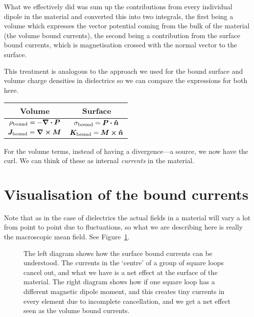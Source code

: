 \documentclass[12pt,chapterprefix=false,dvipsnames]{scrbook}
\theoremstyle{dotless}
\theoremstyle{definition}
\begin{document}
What we effectively did was sum up the contributions from every
individual dipole in the material and converted this into two
integrals, the first being a volume which expresses the vector
potential coming from the bulk of the material (the volume bound
currents), the second being a contribution from the surface
bound currents, which is magnetisation crossed with the normal
vector to the surface.

This treatment is analogous to the approach we used for the
bound surface and volume charge densities in dielectrics so we
can compare the expressions for both here.

\begin{center}
	\begin{tabular}{c  c}
		\textbf{Volume}                              & \textbf{Surface}         \\
		\toprule
		$\rho_\textrm{bound} = -\divergence{\bm{P}}$ & $\sigma_\textrm{bound} =
		\bm{P}\vdot\bm{\hat{n}}$                                                \\
		$\bm{J}_\textrm{bound} =
		\curl{\bm{M}}$                               & $\bm{K}_\textrm{bound} =
		\bm{M}\cross\bm{\hat{n}}$                                               \\
	\end{tabular}
\end{center}

For the volume terms, instead of having a divergence---a source,
we now have the curl. We can think of these as internal
\textit{currents} in the material.

\section{Visualisation of the bound currents}%
\label{sec:visualisation_of_the_bound_currents}

Note that as in the case of dielectrics the actual fields in a
material will vary a lot from point to point due to
fluctuations, so what we are describing here is really the
macroscopic mean field. See Figure~\ref{fig:visualising_magnetic_surface_volume_bound_currents}.

\begin{figure}[htpb]
	\centering
	
	\caption{The left diagram shows how the surface bound currents can be
		understood. The currents in the `centre' of a group of square
		loops cancel out, and what we have is a net effect at the surface of the material.
		The right diagram shows how if one square loop has a different
		magnetic dipole moment, and this creates tiny currents in every element due to
		incomplete cancellation, and we get a net effect seen as the volume bound currents.}%
	\label{fig:visualising_magnetic_surface_volume_bound_currents}
\end{figure}
\end{document}
